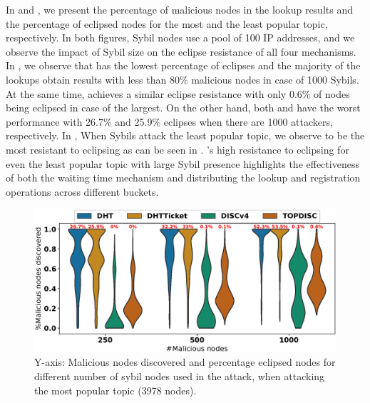 In  and , we present the percentage of malicious nodes in the lookup results and the percentage of eclipsed nodes for the most and the least popular topic, respectively. In both figures, Sybil nodes use a pool of 100 IP addresses, and we observe the impact of Sybil size on the eclipse resistance of all four mechanisms. 
In , we observe that \discv has the lowest percentage of eclipses and the majority of the lookups obtain results with less than 80\% malicious nodes in case of 1000 Sybils. At the same time, \sysname achieves a similar eclipse resistance with only 0.6\% of nodes being eclipsed in case of the largest. On the other hand, both \altname and \altnameticket have the worst performance with 26.7\% and 25.9\% eclipses when there are 1000 attackers, respectively.
In , 
When Sybils attack the least popular topic, we observe \sysname to be the most resistant to eclipsing as can be seen in . \sysname's high resistance to eclipsing for even the least popular topic with large Sybil presence highlights the effectiveness of both the waiting time mechanism and distributing the lookup and registration operations across different buckets.
 
\begin{figure}[!h]
\includegraphics[width=\linewidth]{results/security/violin_percentEvil_percentageMaliciousDiscovered_t0.eps}
\caption{Y-axis: Malicious nodes discovered and percentage eclipsed nodes for different number of sybil nodes used in the attack,  when attacking the most popular topic (3978 nodes).}
\label{fig:eclipse_evil_t0}
\end{figure}

